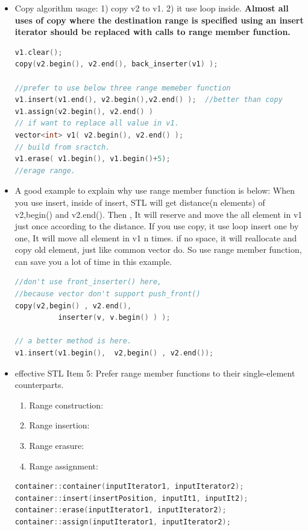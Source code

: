 \documentclass[a4paper,11pt,twoside]{book}
\begin{document}
\begin{itemize}

\item Copy algorithm usage: 1) copy v2 to v1.  2) it use loop inside.  \textbf{Almost all uses of copy where the destination range is specified using an insert iterator should be replaced with calls to range member function.}

\begin{lstlisting}[frame=single, language=c++]
v1.clear();
copy(v2.begin(), v2.end(), back_inserter(v1) );

//prefer to use below three range memeber function
v1.insert(v1.end(), v2.begin(),v2.end() );  //better than copy
v1.assign(v2.begin(), v2.end() )
// if want to replace all value in v1.
vector<int> v1( v2.begin(), v2.end() );
// build from sractch.
v1.erase( v1.begin(), v1.begin()+5);
//erage range.
\end{lstlisting}

\item A good example to explain why use range member function is below: When you use insert, inside of insert,  STL will get distance(n elements) of v2,begin() and v2.end(). Then , It will reserve and move the all element in v1 just once according to the distance.  If you use copy, it use loop insert one by one, It will move all element in v1 n times. if no space, it will reallocate and copy old element, just like common vector do. So use range member function, can save you a lot of time in this example.

\begin{lstlisting}[frame=single, language=c++]
//don't use front_inserter() here,
//because vector don't support push_front()
copy(v2,begin() , v2.end(),
          inserter(v, v.begin() ) );

// a better method is here.
v1.insert(v1.begin(),  v2,begin() , v2.end());
\end{lstlisting}

\item effective STL Item 5: Prefer range member functions to their single-element counterparts.
\begin{enumerate}
\item Range construction:
\item Range insertion:
\item Range erasure:
\item Range assignment:
\end{enumerate}

\begin{lstlisting}[frame=single, language=c++]
container::container(inputIterator1, inputIterator2);
container::insert(insertPosition, inputIt1, inputIt2);
container::erase(inputIterator1, inputIterator2);
container::assign(inputIterator1, inputIterator2);
\end{lstlisting}



\end{itemize}
\end{document}

